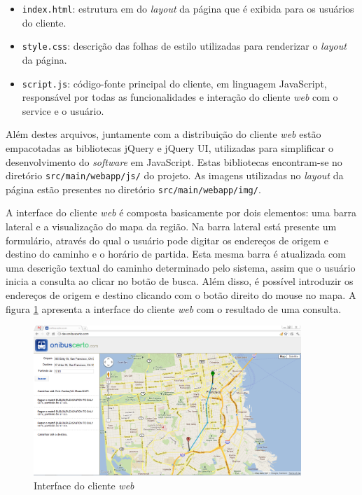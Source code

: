 \begin{itemize}
	\item \texttt{index.html}: estrutura em  do \emph{layout} da página que é exibida para os usuários do cliente.
	\item \texttt{style.css}: descrição das folhas de estilo  utilizadas para renderizar o \emph{layout} da página.
	\item \texttt{script.js}: código-fonte principal do cliente, em linguagem JavaScript, responsável por todas as funcionalidades e interação do cliente \emph{web} com o service e o usuário.
\end{itemize}

Além destes arquivos, juntamente com a distribuição do cliente \emph{web} estão empacotadas as bibliotecas jQuery e jQuery UI, utilizadas para simplificar o desenvolvimento do \emph{software} em JavaScript.
Estas bibliotecas encontram-se no diretório \texttt{src/main/webapp/js/} do projeto.
As imagens utilizadas no \emph{layout} da página estão presentes no diretório \texttt{src/main/webapp/img/}.

A interface do cliente \emph{web} é composta basicamente por dois elementos: uma barra lateral e a visualização do mapa da região.
Na barra lateral está presente um formulário, através do qual o usuário pode digitar os endereços de origem e destino do caminho e o horário de partida.
Esta mesma barra é atualizada com uma descrição textual do caminho determinado pelo sistema, assim que o usuário inicia a consulta ao clicar no botão de busca.
Além disso, é possível introduzir os endereços de origem e destino clicando com o botão direito do mouse no mapa.
A figura \ref{fig:clienteweb} apresenta a interface do cliente \emph{web} com o resultado de uma consulta.

\begin{figure}[!htb]
	\centering
	\includegraphics[width=0.9\textwidth]{./imgs/clienteweb.png}
	\caption[Interface do cliente \emph{web}]{Interface do cliente \emph{web}}
	\label{fig:clienteweb}
\end{figure}

